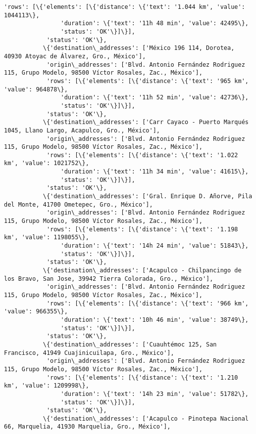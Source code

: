 \documentclass[11pt]{article}
\begin{document}
\begin{Verbatim}[commandchars=\\\{\}]
            'rows': [\{'elements': [\{'distance': \{'text': '1.044 km', 'value': 1044113\},
                'duration': \{'text': '11h 48 min', 'value': 42495\},
                'status': 'OK'\}]\}],
            'status': 'OK'\},
           \{'destination\_addresses': ['México 196 114, Dorotea, 40930 Atoyac de Álvarez, Gro., México'],
            'origin\_addresses': ['Blvd. Antonio Fernández Rodriguez 115, Grupo Modelo, 98500 Víctor Rosales, Zac., México'],
            'rows': [\{'elements': [\{'distance': \{'text': '965 km', 'value': 964878\},
                'duration': \{'text': '11h 52 min', 'value': 42736\},
                'status': 'OK'\}]\}],
            'status': 'OK'\},
           \{'destination\_addresses': ['Carr Cayaco - Puerto Marqués 1045, Llano Largo, Acapulco, Gro., México'],
            'origin\_addresses': ['Blvd. Antonio Fernández Rodriguez 115, Grupo Modelo, 98500 Víctor Rosales, Zac., México'],
            'rows': [\{'elements': [\{'distance': \{'text': '1.022 km', 'value': 1021752\},
                'duration': \{'text': '11h 34 min', 'value': 41615\},
                'status': 'OK'\}]\}],
            'status': 'OK'\},
           \{'destination\_addresses': ['Gral. Enrique D. Añorve, Pila del Monte, 41700 Ometepec, Gro., México'],
            'origin\_addresses': ['Blvd. Antonio Fernández Rodriguez 115, Grupo Modelo, 98500 Víctor Rosales, Zac., México'],
            'rows': [\{'elements': [\{'distance': \{'text': '1.198 km', 'value': 1198055\},
                'duration': \{'text': '14h 24 min', 'value': 51843\},
                'status': 'OK'\}]\}],
            'status': 'OK'\},
           \{'destination\_addresses': ['Acapulco - Chilpancingo de los Bravo, San Jose, 39942 Tierra Colorada, Gro., México'],
            'origin\_addresses': ['Blvd. Antonio Fernández Rodriguez 115, Grupo Modelo, 98500 Víctor Rosales, Zac., México'],
            'rows': [\{'elements': [\{'distance': \{'text': '966 km', 'value': 966355\},
                'duration': \{'text': '10h 46 min', 'value': 38749\},
                'status': 'OK'\}]\}],
            'status': 'OK'\},
           \{'destination\_addresses': ['Cuauhtémoc 125, San Francisco, 41949 Cuajinicuilapa, Gro., México'],
            'origin\_addresses': ['Blvd. Antonio Fernández Rodriguez 115, Grupo Modelo, 98500 Víctor Rosales, Zac., México'],
            'rows': [\{'elements': [\{'distance': \{'text': '1.210 km', 'value': 1209998\},
                'duration': \{'text': '14h 23 min', 'value': 51782\},
                'status': 'OK'\}]\}],
            'status': 'OK'\},
           \{'destination\_addresses': ['Acapulco - Pinotepa Nacional 66, Marquelia, 41930 Marquelia, Gro., México'],

\end{Verbatim}
\end{document}
